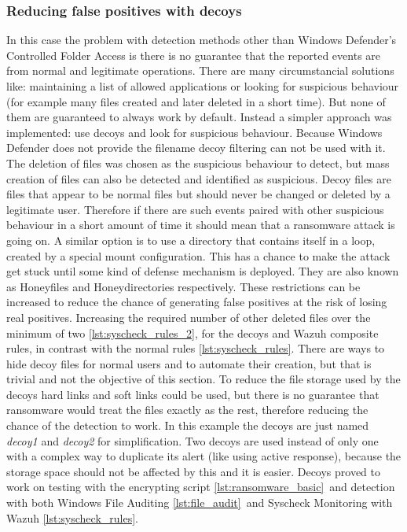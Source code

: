 \subsubsection{Reducing false positives with decoys}
In this case the problem with detection methods other than Windows Defender's Controlled Folder Access is there is no guarantee that the reported events are from normal and legitimate operations.
There are many circumstancial solutions like: maintaining a list of allowed applications or looking for suspicious behaviour (for example many files created and later deleted in a short time).
But none of them are guaranteed to always work by default.
Instead a simpler approach was implemented: use decoys and look for suspicious behaviour.
Because Windows Defender does not provide the filename decoy filtering can not be used with it.
\linej
The deletion of files was chosen as the suspicious behaviour to detect, but mass creation of files can also be detected and identified as suspicious.
\linej
\linej
Decoy files are files that appear to be normal files but should never be changed or deleted by a legitimate user.
Therefore if there are such events paired with other suspicious behaviour in a short amount of time it should mean that a ransomware attack is going on.
\linej
A similar option is to use a directory that contains itself in a loop, created by a special mount configuration.
This has a chance to make the attack get stuck until some kind of defense mechanism is deployed.
They are also known as Honeyfiles and Honeydirectories respectively\cite{ransomware_oReilly}.
\linej
These restrictions can be increased to reduce the chance of generating false positives at the risk of losing real positives.
Increasing the required number of other deleted files over the minimum of two \ref{lst:syscheck_rules_2}, for the decoys and Wazuh composite rules, in contrast with the normal rules \ref{lst:syscheck_rules}.
\linej
There are ways to hide decoy files for normal users and to automate their creation, but that is trivial and not the objective of this section.
To reduce the file storage used by the decoys hard links and soft links could be used, but there is no guarantee that ransomware would treat the files exactly as the rest, therefore reducing the chance of the detection to work.
\linej
In this example the decoys are just named \textit{decoy1} and \textit{decoy2} for simplification.
Two decoys are used instead of only one with a complex way to duplicate its alert (like using active response), because the storage space should not be affected by this and it is easier.
\linej
\linej
Decoys proved to work on testing with the encrypting script \ref{lst:ransomware_basic}\ and detection with both Windows File Auditing \ref{lst:file_audit}\ and Syscheck Monitoring with Wazuh \ref{lst:syscheck_rules}.

